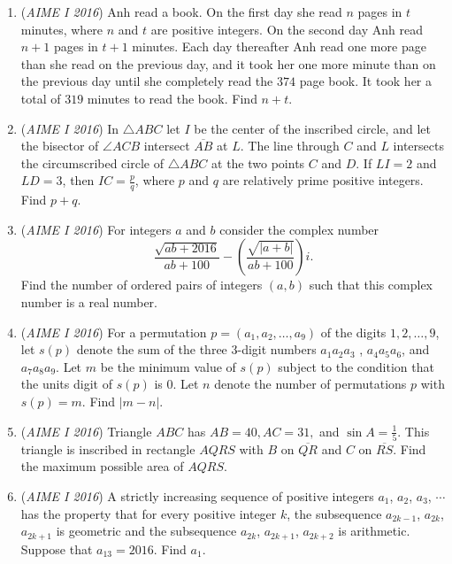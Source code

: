 \begin{enumerate}
 

	\item (\textit{AIME I 2016}) Anh read a book. On the first day she read $n$ pages in $t$ minutes, where $n$ and $t$ are positive integers. On the second day Anh read $n + 1$ pages in $t + 1$ minutes. Each day thereafter Anh read one more page than she read on the previous day, and it took her one more minute than on the previous day until she completely read the $374$ page book. It took her a total of $319$ minutes to read the book. Find $n + t$.


 

	\item (\textit{AIME I 2016}) In $\triangle ABC$ let $I$ be the center of the inscribed circle, and let the bisector of $\angle ACB$ intersect $\overline{AB}$ at $L$. The line through $C$ and $L$ intersects the circumscribed circle of $\triangle ABC$ at the two points $C$ and $D$. If $LI=2$ and $LD=3$, then $IC= \frac{p}{q}$, where $p$ and $q$ are relatively prime positive integers. Find $p+q$.


 

	\item (\textit{AIME I 2016}) For integers $a$ and $b$ consider the complex number 
 \[\frac{\sqrt{ab+2016}}{ab+100}-\left(\frac{\sqrt{|a+b|}}{ab+100}\right)i.\] Find the number of ordered pairs of integers $(a,b)$ such that this complex number is a real number.


 

	\item (\textit{AIME I 2016}) For a permutation $p = (a_1,a_2,\ldots,a_9)$ of the digits $1,2,\ldots,9$, let $s(p)$ denote the sum of the three $3$-digit numbers $a_1a_2a_3$ , $a_4a_5a_6$, and $a_7a_8a_9$. Let $m$ be the minimum value of $s(p)$ subject to the condition that the units digit of $s(p)$ is $0$. Let $n$ denote the number of permutations $p$ with $s(p) = m$. Find $|m - n|$.


 

	\item (\textit{AIME I 2016}) Triangle $ABC$ has $AB=40,AC=31,$ and $\sin{A}=\frac{1}{5}$. This triangle is inscribed in rectangle $AQRS$ with $B$ on $\overline{QR}$ and $C$ on $\overline{RS}$. Find the maximum possible area of $AQRS$.


 

	\item (\textit{AIME I 2016}) A strictly increasing sequence of positive integers $a_1$, $a_2$, $a_3$, $\cdots$ has the property that for every positive integer $k$, the subsequence $a_{2k-1}$, $a_{2k}$, $a_{2k+1}$ is geometric and the subsequence $a_{2k}$, $a_{2k+1}$, $a_{2k+2}$ is arithmetic. Suppose that $a_{13} = 2016$. Find $a_1$.



\end{enumerate}
